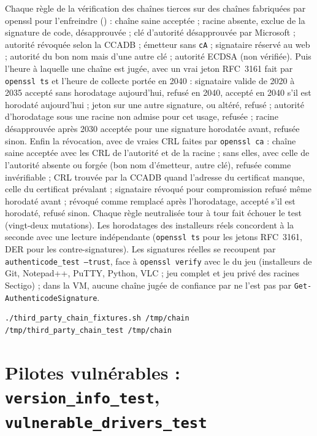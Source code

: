 \documentclass[11pt,a4paper,oneside]{report}
\begin{document}
Chaque règle de la vérification des chaînes tierces sur des chaînes
fabriquées par openssl pour l'enfreindre () :
chaîne saine acceptée ; racine absente, exclue de la signature de code,
désapprouvée ; clé d'autorité désapprouvée par Microsoft ; autorité révoquée
selon la CCADB ; émetteur sans \texttt{cA} ; signataire réservé au web ;
autorité du bon nom mais d'une autre clé ; autorité ECDSA (non vérifiée).
Puis l'heure à laquelle une chaîne est jugée, avec un vrai jeton RFC~3161 fait
par \texttt{openssl ts} et l'heure de collecte portée en 2040 : signataire
valide de 2020 à 2035 accepté sans horodatage aujourd'hui, refusé en 2040,
accepté en 2040 s'il est horodaté aujourd'hui ; jeton sur une autre
signature, ou altéré, refusé ; autorité d'horodatage sous une racine non
admise pour cet usage, refusée ; racine désapprouvée après 2030 acceptée pour
une signature horodatée avant, refusée sinon. Enfin la révocation, avec de
vraies CRL faites par \texttt{openssl ca} : chaîne saine acceptée avec les CRL
de l'autorité et de la racine ; sans elles, avec celle de l'autorité absente ou
forgée (bon nom d'émetteur, autre clé), refusée comme invérifiable ; CRL
trouvée par la CCADB quand l'adresse du certificat manque, celle du certificat
prévalant ; signataire révoqué pour compromission refusé même horodaté avant ;
révoqué comme remplacé après l'horodatage, accepté s'il est horodaté, refusé
sinon. Chaque règle neutralisée tour à tour fait échouer le test (vingt-deux
mutations). Les horodatages des installeurs
réels concordent à la seconde avec une lecture indépendante (\texttt{openssl
ts} pour les jetons RFC~3161, DER pour les contre-signatures).
Les signatures réelles se recoupent par \texttt{authenticode\_test --trust},
face à \texttt{openssl verify} avec le  du jeu (installeurs
de Git, Notepad++, PuTTY, Python, VLC ; jeu complet et jeu privé des racines
Sectigo) ; dans la VM, aucune chaîne jugée de confiance par \wac{} ne l'est
pas par \texttt{Get-AuthenticodeSignature}.

\begin{lstlisting}
./third_party_chain_fixtures.sh /tmp/chain
/tmp/third_party_chain_test /tmp/chain
\end{lstlisting}

\section{Pilotes vulnérables : \texttt{version\_info\_test}, \texttt{vulnerable\_drivers\_test}}
\end{document}
